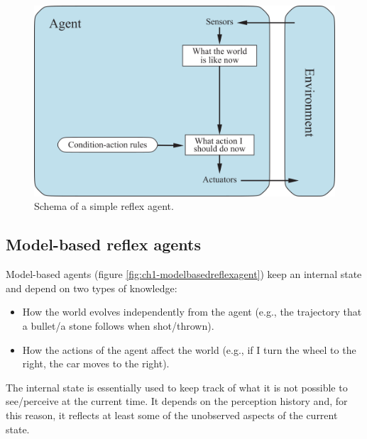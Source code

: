 \begin{figure}[hbt]
    \centering
    \includegraphics{Images/Chapter 1/simple-reflex-agents.png}
    \caption{Schema of a simple reflex agent.}
    \label{fig:ch1-simplereflexagent}
\end{figure}

\subsection{Model-based reflex agents}
Model-based agents (figure \ref{fig:ch1-modelbasedreflexagent}) keep an internal state and depend on two types of knowledge:

\begin{itemize}
    \item How the world evolves independently from the agent (e.g., the trajectory that a bullet/a stone follows when shot/thrown).
    \item How the actions of the agent affect the world (e.g., if I turn the wheel to the right, the car moves to the right).
\end{itemize}

The internal state is essentially used to keep track of what it is not possible to see/perceive at the current time. It depends on the perception history and, for this reason, it reflects at least some of the unobserved aspects of the current state.

